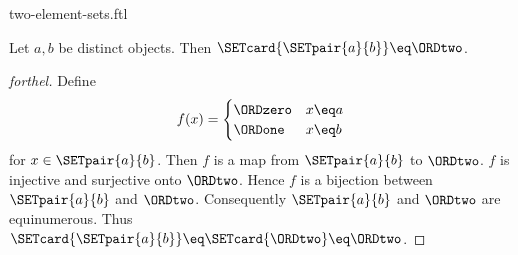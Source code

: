 \documentclass{stex}
\begin{document}
\begin{smodule}{two-element-sets.ftl}

\begin{proposition}[forthel,id=SET_THEORY_07_5465279026954240]
  Let $a, b$ be distinct objects.
  Then $\SETcard{\SETpair{a}{b}} \eq \ORDtwo$.
\end{proposition}
\begin{proof}[forthel]
  Define \[ f(x) =
    \begin{cases}
      \ORDzero & x \eq a
      \\
      \ORDone & x \eq b
    \end{cases} \]
  for $x \in \SETpair{a}{b}$.
  Then $f$ is a map from $\SETpair{a}{b}$ to $\ORDtwo$.
  $f$ is injective and surjective onto $\ORDtwo$.
  Hence $f$ is a bijection between $\SETpair{a}{b}$ and $\ORDtwo$.
  Consequently $\SETpair{a}{b}$ and $\ORDtwo$ are equinumerous.
  Thus $\SETcard{\SETpair{a}{b}} \eq \SETcard{\ORDtwo} \eq \ORDtwo$.
\end{proof}
\end{smodule}
\end{document}
